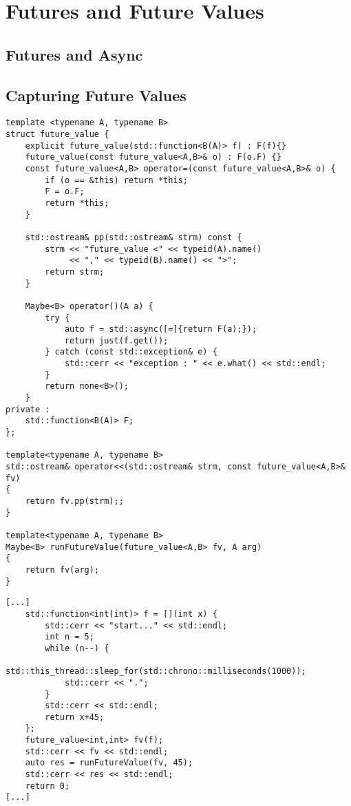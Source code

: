 \documentclass[12pt,fleqn]{article}
\begin{document}
\section{Futures and Future Values}
%
%

%
%
\subsection{Futures and Async}
%

\subsection{Capturing Future Values}

%
%
%
\begin{minipage}{\linewidth}
\begin{lstlisting}[caption=Future value type class, label=fv]
template <typename A, typename B>
struct future_value {
	explicit future_value(std::function<B(A)> f) : F(f){}
	future_value(const future_value<A,B>& o) : F(o.F) {}
	const future_value<A,B> operator=(const future_value<A,B>& o) {
		if (o == &this) return *this;
		F = o.F;
		return *this;
	}

	std::ostream& pp(std::ostream& strm) const {
		strm << "future_value <" << typeid(A).name() 
			 << "," << typeid(B).name() << ">";
		return strm;
	}

	Maybe<B> operator()(A a) {
		try {
			auto f = std::async([=]{return F(a);});
			return just(f.get());
		} catch (const std::exception& e) {
			std::cerr << "exception : " << e.what() << std::endl;
		}
		return none<B>();
	}
private :
	std::function<B(A)> F;
};

template<typename A, typename B>
std::ostream& operator<<(std::ostream& strm, const future_value<A,B>& fv) 
{
	return fv.pp(strm);;
}

template<typename A, typename B>
Maybe<B> runFutureValue(future_value<A,B> fv, A arg)
{
	return fv(arg);
}

\end{lstlisting}
\end{minipage}
%
%
%


%
%
\begin{minipage}{\linewidth}
\begin{lstlisting}[caption=Example of the use of the future value type class,label=fvexamp]
[...]
	std::function<int(int)> f = [](int x) { 
		std::cerr << "start..." << std::endl;
		int n = 5;
		while (n--) {
			std::this_thread::sleep_for(std::chrono::milliseconds(1000));
			std::cerr << ".";
		}
		std::cerr << std::endl;
		return x+45;
	};
	future_value<int,int> fv(f);
	std::cerr << fv << std::endl;
	auto res = runFutureValue(fv, 45);
	std::cerr << res << std::endl;
	return 0;
[...]
\end{lstlisting}
\end{minipage}
%
%
%
\end{document}
